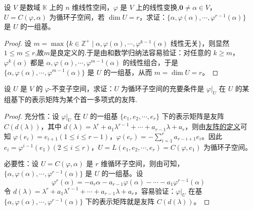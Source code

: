 \documentclass[../../main.tex]{subfiles}
\begin{document}
\begin{theorem}\label{theorem:循环子空间的基}
设 \(V\) 是数域 \(\mathbb{K}\) 上的 \(n\) 维线性空间，\(\varphi\) 是 \(V\) 上的线性变换,\(\mathbf{0}\neq\alpha\in V\)， \(U = C(\varphi,\alpha)\) 为循环子空间，若 \(\dim U = r\)，求证：\(\{\alpha,\varphi(\alpha),\cdots,\varphi^{r - 1}(\alpha)\}\) 是 \(U\) 的一组基。
\end{theorem}
\begin{proof}
设 \(m = \max\{k\in\mathbb{Z}^+\mid\alpha,\varphi(\alpha),\cdots,\varphi^{k - 1}(\alpha)\text{ 线性无关}\}\)，则显然$1\leq m\leq r$,故$m$是良定义的.于是由和数学归纳法容易验证：对任意的 \(k\geq m\)，\(\varphi^k(\alpha)\) 都是 \(\alpha,\varphi(\alpha),\cdots,\varphi^{m - 1}(\alpha)\) 的线性组合，于是 \(\{\alpha,\varphi(\alpha),\cdots,\varphi^{m - 1}(\alpha)\}\) 是 \(U\) 的一组基，从而 \(m = \dim U = r\)。 
\end{proof}

\begin{theorem}\label{theorem:不变子空间是循环子空间的充要条件}
设 \(U\) 是 \(V\) 的 \(\varphi\)-不变子空间，求证：\(U\) 为循环子空间的充要条件是 \(\varphi|_U\) 在 \(U\) 的某组基下的表示矩阵为某个首一多项式的友阵.
\end{theorem}
\begin{proof}
{\heiti 充分性：}设 \(\varphi|_U\) 在 \(U\) 的一组基 \(\{e_1,e_2,\cdots,e_r\}\) 下的表示矩阵是友阵 \(C(d(\lambda))\)，其中 \(d(\lambda)=\lambda^r + a_1\lambda^{r - 1}+\cdots + a_{r - 1}\lambda + a_r\)，则由\hyperref[proposition:多项式的友矩和Frobenius块]{友阵的定义}可知 \(\varphi(e_i)=e_{i + 1}(1\leq i\leq r - 1)\)，\(\varphi(e_r)=-\sum_{i = 1}^{r}a_{r - i + 1}e_i\)。因此 \(e_i=\varphi^{i - 1}(e_1)(2\leq i\leq r)\)，\(U = L(e_1,e_2,\cdots,e_r)=C(\varphi,e_1)\) 为循环子空间。

{\heiti 必要性：}设 \(U = C(\varphi,\alpha)\) 是 \(r\) 维循环子空间，则由可知，\(\{\alpha,\varphi(\alpha),\cdots,\varphi^{r - 1}(\alpha)\}\) 是 \(U\) 的一组基。设 
\[
\varphi^r(\alpha)=-a_r\alpha - a_{r - 1}\varphi(\alpha)-\cdots - a_1\varphi^{r - 1}(\alpha)
\]
令 \(d(\lambda)=\lambda^r + a_1\lambda^{r - 1}+\cdots + a_{r - 1}\lambda + a_r\)，容易验证：\(\varphi|_U\) 在基 \(\{\alpha,\varphi(\alpha),\cdots,\varphi^{r - 1}(\alpha)\}\) 下的表示矩阵就是友阵 \(C(d(\lambda))\)。
\end{proof}
\end{document}

